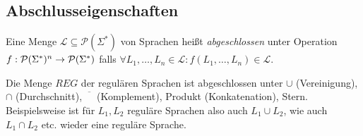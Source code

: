 \subsection{Abschlusseigenschaften}
\begin{Def}[name={[Abgeschlossenheit von $\mathcal{L}$]}]
        Eine Menge $\mathcal{L}\subseteq \mathcal{P}(\Sigma^*)$ von Sprachen heißt \emph{abgeschlossen} unter Operation \\
        $f:\mathcal{P}(\Sigma^*)^n \-> \mathcal{P}(\Sigma^*)$ falls $\forall L_1,\dots, L_n\in \mathcal{L} : f(L_1,\dots, L_n)\in \mathcal{L}$.
\end{Def}
\begin{Satz}[name={[Abgeschlossenheit von $REG$]}]\label{satz:3.8}
        Die Menge $REG$ der regulären Sprachen ist abgeschlossen unter $\cup$ (Vereinigung), $\cap$ (Durchschnitt), $\overline{\phantom{X}}$ (Komplement), Produkt (Konkatenation), Stern. Beispielsweise ist für $L_1, L_2$ reguläre Sprachen also auch $L_1 \cup L_2$, wie auch $L_1 \cap L_2$ etc. wieder eine reguläre Sprache.
\end{Satz}
